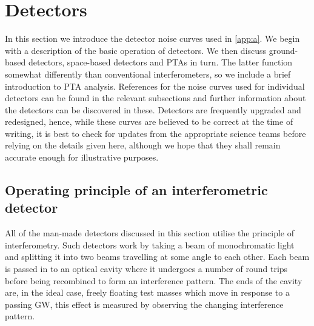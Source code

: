 \section{Detectors}\label{sec:detectors}

In this section we introduce the detector noise curves used in \ref{app:a}. We begin with a description of the basic operation of detectors. We then discuss ground-based detectors, space-based detectors and PTAs in turn. The latter function somewhat differently than conventional interferometers, so we include a brief introduction to PTA analysis. References for the noise curves used for individual detectors can be found in the relevant subsections and further information about the detectors can be discovered in these. Detectors are frequently upgraded and redesigned, hence, while these curves are believed to be correct at the time of writing, it is best to check for updates from the appropriate science teams before relying on the details given here, although we hope that they shall remain accurate enough for illustrative purposes.

\subsection{Operating principle of an interferometric detector}\label{sec:principles}

All of the man-made detectors discussed in this section utilise the principle of interferometry. Such detectors work by taking a beam of monochromatic light and splitting it into two beams travelling at some angle to each other. Each beam is passed in to an optical cavity where it undergoes a number of round trips before being recombined to form an interference pattern. The ends of the cavity are, in the ideal case, freely floating test masses which move in response to a passing GW, this effect is measured by observing the changing interference pattern.


